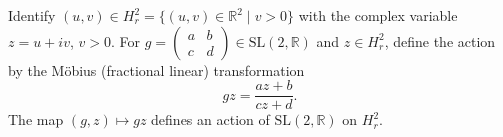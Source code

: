 Identify $(u,v) \in H_r^2 = \{ (u,v) \in \mathbb{R}^2 \mid v > 0 \}$ with the complex variable $z = u + iv$, $v > 0$. For $g = \begin{pmatrix} a & b \\ c & d \end{pmatrix} \in \mathrm{SL}(2, \mathbb{R})$ and $z \in H_r^2$, define the action by the M\"obius (fractional linear) transformation
$$
g z = \frac{a z + b}{c z + d}.
$$
The map $(g, z) \mapsto g z$ defines an action of $\mathrm{SL}(2, \mathbb{R})$ on $H_r^2$.
